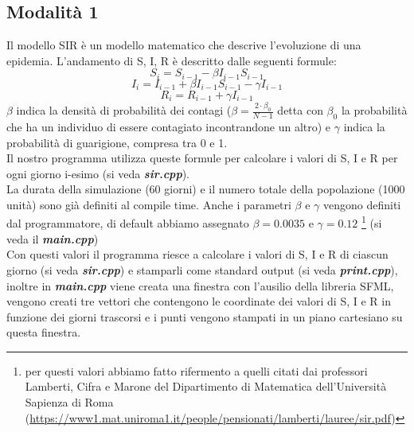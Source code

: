 \documentclass[a4paper,10 pt]{article}
\begin{document}
\subsection{Modalità 1}
Il modello SIR è un modello matematico che descrive l'evoluzione di una epidemia. L'andamento di S, I, R è descritto dalle seguenti formule:
$$
S_i = S_{i - 1} - \beta I_{i - 1}S_{i - 1} 
$$
$$
I_i = I_{i - 1} + \beta I_{i - 1}S_{i - 1} - \gamma I_{i - 1}
$$
$$
R_i = R_{i - 1} + \gamma I_{i - 1}
$$
$\beta$ indica la densità di probabilità dei contagi ($\beta = \frac{2\cdot \beta_0}{N-1}$ detta con $\beta_0$ la probabilità che ha un individuo di essere contagiato incontrandone un altro) e $\gamma$ indica la probabilità di guarigione, compresa tra 0 e 1.
\ \\
Il nostro programma utilizza queste formule per calcolare i valori di S, I e R per ogni giorno i-esimo (si veda  \textbf{\textit{sir.cpp}}).
\ \\
La durata della simulazione (60 giorni) e il numero totale della popolazione (1000 unità) sono già definiti al compile time. Anche i parametri $\beta$ e $\gamma$ vengono definiti dal programmatore, di default abbiamo assegnato $\beta = 0.0035$ e $\gamma = 0.12$ \footnote{per questi valori abbiamo fatto rifermento a quelli citati dai professori Lamberti, Cifra e Marone del Dipartimento di Matematica dell'Università Sapienza di Roma (\url{https://www1.mat.uniroma1.it/people/pensionati/lamberti/lauree/sir.pdf})} (si veda il \textbf{\textit{main.cpp}})
\\ 
Con questi valori il programma riesce a calcolare i valori di S, I e R di ciascun giorno (si veda  \textbf{\textit{sir.cpp}}) e stamparli come standard output (si veda  \textbf{\textit{print.cpp}}), inoltre in \textbf{\textit{main.cpp}} viene creata una finestra con l'ausilio della libreria SFML, vengono creati tre vettori che contengono le coordinate dei valori di S, I e R in funzione dei giorni trascorsi e i punti vengono stampati in un piano cartesiano su questa finestra.
\end{document}
